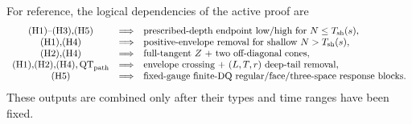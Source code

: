 \documentclass[11pt]{article}
\begin{document}
For reference, the logical dependencies of the active proof are
\begingroup\small
\[
\begin{array}{ccl}
 \textup{(H1)--(H3),(H5)}&\Longrightarrow&
   \text{prescribed-depth endpoint low/high for }N\le T_{\rm sh}(s),\\
 \textup{(H1),(H4)}&\Longrightarrow&
   \text{positive-envelope removal for shallow }N>T_{\rm sh}(s),\\
 \textup{(H2),(H4)}&\Longrightarrow&
   \text{full-tangent }Z\text{ + two off-diagonal cones},\\
 \textup{(H1),(H2),(H4)},\mathrm{QT}_{\rm path}&\Longrightarrow&
   \text{envelope crossing + }(L,T,r)\text{ deep-tail removal},\\
 \textup{(H5)}&\Longrightarrow&
   \text{fixed-gauge finite-DQ regular/face/three-space response blocks}.
\end{array}
\]
\endgroup
These outputs are combined only after their types and time ranges have been
fixed.
\end{document}
